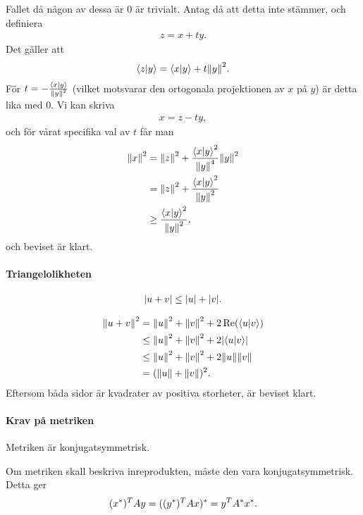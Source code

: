 \proof
Fallet då någon av dessa är $0$ är trivialt. Antag då att detta inte stämmer, och definiera
\begin{align*}
	z = x + ty.
\end{align*}
Det gäller att
\begin{align*}
	\bra{z}\ket{y} = \bra{x}\ket{y} + t\norm{y}^{2}.
\end{align*}
För $t = -\frac{\bra{x}\ket{y}}{\norm{y}^{2}}$ (vilket motsvarar den ortogonala projektionen av $x$ på $y$) är detta lika med $0$. Vi kan skriva
\begin{align*}
	x = z - ty,
\end{align*}
och för vårat specifika val av $t$ får man
\begin{align*}
	\norm{x}^{2} &= \norm{z}^{2} + \frac{\bra{x}\ket{y}^{2}}{\norm{y}^{4}}\norm{y}^{2} \\
	             &= \norm{z}^{2} + \frac{\bra{x}\ket{y}^{2}}{\norm{y}^{2}} \\
	             &\geq \frac{\bra{x}\ket{y}^{2}}{\norm{y}^{2}},
\end{align*}
och beviset är klart.

\paragraph{Triangelolikheten}

\begin{align*}
	\abs{u + v} \leq \abs{u} + \abs{v}.
\end{align*}

\proof
\begin{align*}
	\norm{u + v}^{2} &= \norm{u}^{2} + \norm{v}^{2} + 2\Re(\bra{u}\ket{v}) \\
	                 &\leq \norm{u}^{2} + \norm{v}^{2} + 2\abs{\bra{u}\ket{v}} \\
	                 &\leq \norm{u}^{2} + \norm{v}^{2} + 2\norm{u}\norm{v} \\
	                 &= (\norm{u} + \norm{v})^{2}.
\end{align*}
Eftersom båda sidor är kvadrater av positiva storheter, är beviset klart.

\paragraph{Krav på metriken}
Metriken är konjugatsymmetrisk.

\proof
Om metriken skall beskriva inreprodukten, måste den vara konjugatsymmetrisk. Detta ger
\begin{align*}
	(x^{*})^{T}Ay = ((y^{*})^{T}Ax)^{*} = y^{T}A^{*}x^{*}.
\end{align*}

